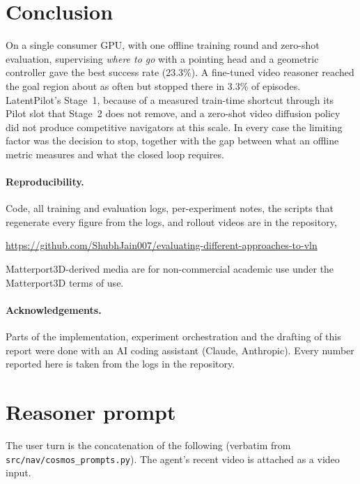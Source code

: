 \documentclass[11pt]{article}
\begin{document}
\section{Conclusion}

On a single consumer GPU, with one offline training round and zero-shot evaluation, supervising \emph{where to go}
with a pointing head and a geometric controller gave the best success rate (23.3\%). A fine-tuned video reasoner reached the goal region about as often but stopped
there in 3.3\% of episodes. LatentPilot's Stage~1, because of a measured train-time shortcut through its Pilot slot that
Stage~2 does not remove, and a zero-shot video diffusion policy did not produce competitive navigators at this scale. In every case the limiting factor was the decision to stop, together with the gap between
what an offline metric measures and what the closed loop requires.

\paragraph{Reproducibility.}
Code, all training and evaluation logs, per-experiment notes, the scripts that regenerate every figure from the logs,
and rollout videos are in the repository,
\begin{center}\url{https://github.com/ShubhJain007/evaluating-different-approaches-to-vln}\end{center}
Matterport3D-derived media are for non-commercial academic use under the Matterport3D terms of use.

\paragraph{Acknowledgements.}
Parts of the implementation, experiment orchestration and the drafting of this report were done with an AI coding
assistant (Claude, Anthropic). Every number reported here is taken from the logs in the repository.




\appendix
\section{Reasoner prompt}
\label{app:prompt}
The user turn is the concatenation of the following (verbatim from \texttt{src/nav/cosmos\_prompts.py}). The agent's
recent video is attached as a video input.
\end{document}
